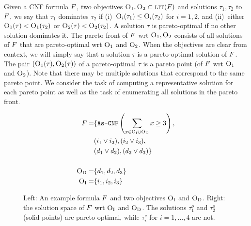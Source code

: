 
Given a CNF formula $F$, two objectives $\textsc{O}_1, \textsc{O}_2 \subset \textsc{lit}(F)$ and solutions $\tau_1, \tau_2$ to $F$, we say that $\tau_1$
dominates  $\tau_2$ if (i)~$\textsc{O}_i(\tau_1) \leq \textsc{O}_i(\tau_2)$ for $i=1,2$, and (ii)~either
$\textsc{O}_1(\tau) < \textsc{O}_1(\tau_2)$  or $\textsc{O}_2(\tau) < \textsc{O}_2(\tau_2)$.
A solution $\tau$ is pareto-optimal if no other solution dominates it. The pareto front of $F$ wrt $\textsc{O}_1, \textsc{O}_2$ consists of all solutions of
 $F$ that are pareto-optimal wrt $\textsc{O}_1$ and $\textsc{O}_2$. 
When the objectives are clear from context, we will simply say that a solution $\tau$ is a pareto-optimal solution of $F$. 
The pair $(\textsc{O}_1(\tau),\textsc{O}_2(\tau))$ of a pareto-optimal $\tau$ is a pareto point (of $F$ wrt $\textsc{O}_1$ and $\textsc{O}_2$).
Note that there may be multiple solutions that correspond to the same pareto point.
We consider the task of computing a representative solution for each pareto point as well as the task of enumerating all solutions in the pareto front.

\begin{figure}
  \begin{minipage}{0.36\textwidth}
  \footnotesize
  \begin{align*}
  F = &\{ \texttt{As-CNF}\left(\sum_ {x \in \textsc{O}_{\text{I}} \cup \textsc{O}_{\text{D}}} x \geq 3 \right), \\
  			&(i_1 \lor i_2),  (i_2 \lor i_3), \\
		 &(d_1 \lor d_2), (d_2 \lor d_3) \} \\ \\
  \textsc{O}_{\text{D}} =&\{ d_1,d_2, d_3\}   \\ 
  \textsc{O}_{\text{I}} =&\{ i_1,i_2, i_3\}  
  \end{align*}
  \end{minipage}
  \;
  \begin{minipage}{0.6\textwidth}
  \end{minipage}
  \caption{Left: An example formula $F$ and two objectives $\textsc{O}_{\text{I}}$ and $\textsc{O}_{\text{D}}$. Right: the solution space of 
  $F$ wrt $\textsc{O}_{\text{I}}$ and $\textsc{O}_{\text{D}}$. The solutions $\tau^o_1$ and $\tau^o_2$ (solid points) are pareto-optimal, 
  while $\tau^c_i$ for $i=1,\ldots,4$ are  not.\label{fig:search-trace}}
\end{figure}

